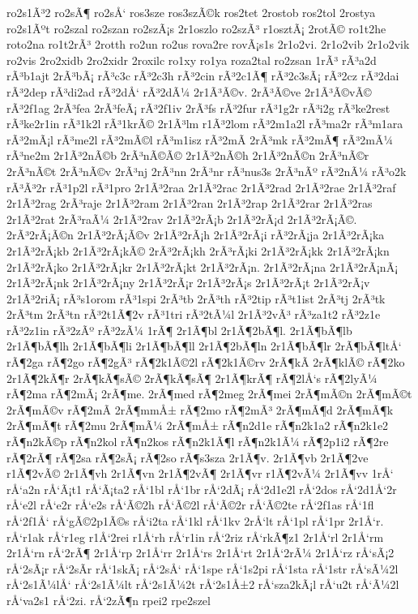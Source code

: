 {ro2s1Ã³2
ro2sÃ¶
ro2sÅ‘
ros3sze
ros3szÃ©k
ros2tet
2rostob
ros2tol
2rostya
ro2s1Ãºt
ro2szal
ro2szan
ro2szÃ¡s
2r1oszlo
ro2szÃ³
r1osztÃ¡
2rotÃ©
ro1t2he
roto2na
ro1t2rÃ³
2rotth
ro2un
ro2us
rova2re
rovÃ¡s1s
2r1o2vi.
2r1o2vib
2r1o2vik
ro2vis
2ro2xidb
2ro2xidr
2roxilc
ro1xy
ro1ya
roza2tal
ro2zsan
1rÃ³
rÃ³a2d
rÃ³b1ajt
2rÃ³bÃ¡
rÃ³c3c
rÃ³2c3h
rÃ³2cin
rÃ³2c1Ã¶
rÃ³2c3sÃ¡
rÃ³2cz
rÃ³2dai
rÃ³2dep
rÃ³di2ad
rÃ³2dÅ‘
rÃ³2dÃ¼
2r1Ã³Ã©v.
2rÃ³Ã©ve
2r1Ã³Ã©vÃ©
rÃ³2f1ag
2rÃ³fea
2rÃ³feÃ¡
rÃ³2f1iv
2rÃ³fs
rÃ³2fur
rÃ³1g2r
rÃ³i2g
rÃ³ke2rest
rÃ³ke2r1in
rÃ³1k2l
rÃ³1krÃ©
2r1Ã³lm
r1Ã³2lom
rÃ³2m1a2l
rÃ³ma2r
rÃ³m1ara
rÃ³2mÃ¡l
rÃ³me2l
rÃ³2mÃ©l
rÃ³m1isz
rÃ³2mÃ­
2rÃ³mk
rÃ³2mÃ¶
rÃ³2mÃ¼
rÃ³ne2m
2r1Ã³2nÃ©b
2rÃ³nÃ©Ã©
2r1Ã³2nÃ©h
2r1Ã³2nÃ©n
2rÃ³nÃ©r
2rÃ³nÃ©t
2rÃ³nÃ©v
2rÃ³nj
2rÃ³nn
2rÃ³nr
rÃ³nus3s
2rÃ³nÃº
rÃ³2nÃ¼
rÃ³o2k
rÃ³Ã³2r
rÃ³1p2l
rÃ³1pro
2r1Ã³2raa
2r1Ã³2rac
2r1Ã³2rad
2r1Ã³2rae
2r1Ã³2raf
2r1Ã³2rag
2rÃ³raje
2r1Ã³2ram
2r1Ã³2ran
2r1Ã³2rap
2r1Ã³2rar
2r1Ã³2ras
2r1Ã³2rat
2rÃ³raÃ¼
2r1Ã³2rav
2r1Ã³2rÃ¡b
2r1Ã³2rÃ¡d
2r1Ã³2rÃ¡Ã©.
2rÃ³2rÃ¡Ã©n
2r1Ã³2rÃ¡Ã©v
2r1Ã³2rÃ¡h
2r1Ã³2rÃ¡i
rÃ³2rÃ¡ja
2r1Ã³2rÃ¡ka
2r1Ã³2rÃ¡kb
2r1Ã³2rÃ¡kÃ©
2rÃ³2rÃ¡kh
2rÃ³rÃ¡ki
2r1Ã³2rÃ¡kk
2r1Ã³2rÃ¡kn
2r1Ã³2rÃ¡ko
2r1Ã³2rÃ¡kr
2r1Ã³2rÃ¡kt
2r1Ã³2rÃ¡n.
2r1Ã³2rÃ¡na
2r1Ã³2rÃ¡nÃ¡
2r1Ã³2rÃ¡nk
2r1Ã³2rÃ¡ny
2r1Ã³2rÃ¡r
2r1Ã³2rÃ¡s
2r1Ã³2rÃ¡t
2r1Ã³2rÃ¡v
2r1Ã³2riÃ¡
rÃ³s1orom
rÃ³1spi
2rÃ³tb
2rÃ³th
rÃ³2tip
rÃ³t1ist
2rÃ³tj
2rÃ³tk
2rÃ³tm
2rÃ³tn
rÃ³2t1Ã¶2v
rÃ³1tri
rÃ³2tÃ¼l
2r1Ã³2vÃ³
rÃ³za1t2
rÃ³2z1e
rÃ³2z1in
rÃ³2zÃº
rÃ³2zÃ¼
1rÃ¶
2r1Ã¶bl
2r1Ã¶2bÃ¶l.
2r1Ã¶bÃ¶lb
2r1Ã¶bÃ¶lh
2r1Ã¶bÃ¶li
2r1Ã¶bÃ¶ll
2r1Ã¶2bÃ¶ln
2r1Ã¶bÃ¶lr
2rÃ¶bÃ¶ltÅ‘
rÃ¶2ga
rÃ¶2go
rÃ¶2gÃ³
rÃ¶2k1Ã©2l
rÃ¶2k1Ã©rv
2rÃ¶kÃ­
2rÃ¶klÃ©
rÃ¶2ko
2r1Ã¶2kÃ¶r
2rÃ¶kÃ¶sÃ©
2rÃ¶kÃ¶sÃ¶
2r1Ã¶krÃ¶
rÃ¶2lÅ‘s
rÃ¶2lyÃ¼
rÃ¶2ma
rÃ¶2mÃ¡
2rÃ¶me.
2rÃ¶med
rÃ¶2meg
2rÃ¶mei
2rÃ¶mÃ©n
2rÃ¶mÃ©t
2rÃ¶mÃ©v
rÃ¶2mÃ­
2rÃ¶mmÅ±
rÃ¶2mo
rÃ¶2mÃ³
2rÃ¶mÃ¶d
2rÃ¶mÃ¶k
2rÃ¶mÃ¶t
rÃ¶2mu
2rÃ¶mÃ¼
2rÃ¶mÅ±
rÃ¶n2d1e
rÃ¶n2k1a2
rÃ¶n2k1e2
rÃ¶n2kÃ©p
rÃ¶n2kol
rÃ¶n2kos
rÃ¶n2k1Ã¶l
rÃ¶n2k1Ã¼
rÃ¶2p1i2
rÃ¶2re
rÃ¶2rÃ¶
rÃ¶2sa
rÃ¶2sÃ¡
rÃ¶2so
rÃ¶s3sza
2r1Ã¶v.
2r1Ã¶vb
2r1Ã¶2ve
r1Ã¶2vÃ©
2r1Ã¶vh
2r1Ã¶vn
2r1Ã¶2vÃ¶
2r1Ã¶vr
r1Ã¶2vÃ¼
2r1Ã¶vv
1rÅ‘
rÅ‘a2n
rÅ‘Ã¡t1
rÅ‘Ã¡ta2
rÅ‘1bl
rÅ‘1br
rÅ‘2dÃ¡
rÅ‘2d1e2l
rÅ‘2dos
rÅ‘2d1Å‘2r
rÅ‘e2l
rÅ‘e2r
rÅ‘e2s
rÅ‘Ã©2h
rÅ‘Ã©2l
rÅ‘Ã©2r
rÅ‘Ã©2te
rÅ‘2f1as
rÅ‘1fl
rÅ‘2f1Å‘
rÅ‘gÃ©2p1Ã©s
rÅ‘i2ta
rÅ‘1kl
rÅ‘1kv
2rÅ‘lt
rÅ‘1pl
rÅ‘1pr
2r1Å‘r.
rÅ‘r1ak
rÅ‘r1eg
r1Å‘2rei
r1Å‘rh
rÅ‘r1in
rÅ‘2riz
rÅ‘rkÃ¶z1
2r1Å‘rl
2r1Å‘rm
2r1Å‘rn
rÅ‘2rÃ¶
2r1Å‘rp
2r1Å‘rr
2r1Å‘rs
2r1Å‘rt
2r1Å‘2rÃ¼
2r1Å‘rz
rÅ‘sÃ¡2
rÅ‘2sÃ¡r
rÅ‘2sÃ­r
rÅ‘1skÃ¡
rÅ‘2sÅ‘
rÅ‘1spe
rÅ‘1s2pi
rÅ‘1sta
rÅ‘1str
rÅ‘sÃ¼2l
rÅ‘2s1Ã¼lÅ‘
rÅ‘2s1Ã¼lt
rÅ‘2s1Ã¼2t
rÅ‘2s1Å±2
rÅ‘sza2kÃ¡l
rÅ‘u2t
rÅ‘Ã¼2l
rÅ‘va2s1
rÅ‘2zi.
rÅ‘2zÃ¶n
rpei2
rpe2szel
}
